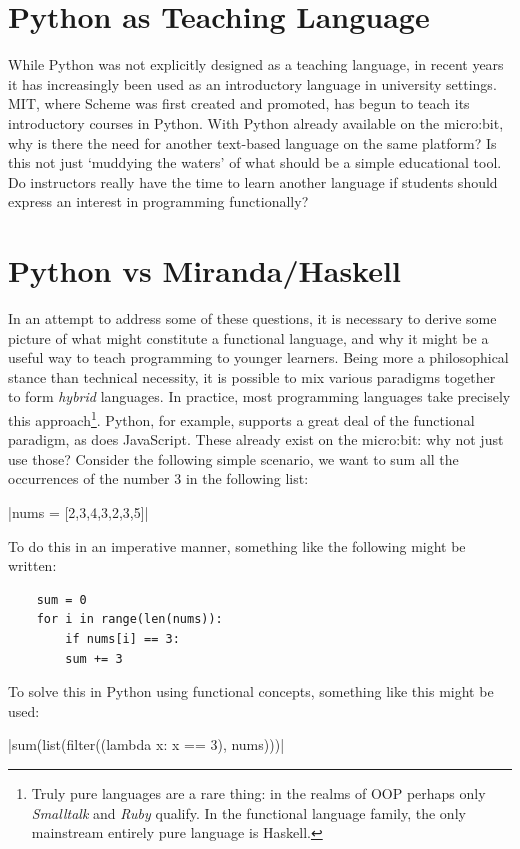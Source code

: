 \documentclass[12pt, a4paper]{report}
\begin{document}
\section{Python as Teaching Language}
While Python was not explicitly designed as a teaching language, in recent years it has increasingly
been used as an introductory language in university settings. MIT, where Scheme was first created
and promoted, has begun to teach its introductory courses in Python. With Python already available
on the micro:bit, why is there the need for another text-based language on the same platform? Is
this not just `muddying the waters' of what should be a simple educational tool. Do instructors
really have the time to learn another language if students should express an interest in programming
functionally?

\section{Python vs Miranda/Haskell}
In an attempt to address some of these questions, it is necessary to derive some picture of what might
constitute a functional language, and why it might be a useful way to teach programming to younger
learners. Being more a philosophical stance than technical necessity, it is possible to mix various
paradigms together to form \textit{hybrid} languages. In practice, most programming languages take
precisely this approach\footnote{Truly pure languages are a rare thing: in the realms of OOP perhaps
only \textit{Smalltalk} and \textit{Ruby} qualify. In the functional language family, the only
mainstream entirely pure language is Haskell.}. Python, for example, supports a great deal of the 
functional paradigm, as does JavaScript. These already exist on the micro:bit: why not just use those? 
Consider the following simple scenario, we want to sum all the occurrences of the number 3 in the
following list: 

|nums = [2,3,4,3,2,3,5]|

To do this in an imperative manner, something like the following might be written:

\begin{verbatim}
    sum = 0
    for i in range(len(nums)):
        if nums[i] == 3:
        sum += 3
\end{verbatim}

To solve this in Python using functional concepts, something like this might be used:

|sum(list(filter((lambda x: x == 3), nums)))|
\end{document}
